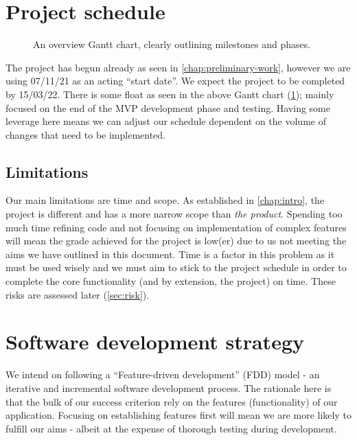 \vspace{-5mm}
\section{Project schedule}
\begin{figure}[H]
    \noindent{}
    \caption{An overview Gantt chart, clearly outlining milestones and phases.}
    \label{fig:gantt}
\end{figure}
\vspace{-5mm}
The project has begun already as seen in \cref{chap:preliminary-work}, however
we are using 07/11/21 as an acting ``start date''. We expect the project to be completed by
15/03/22. There is some float as seen in the above Gantt chart (\cref{fig:gantt});
mainly focused on the end of the MVP development phase and testing. Having some leverage
here means we can adjust our schedule dependent on the volume of changes that need to be implemented.
\vspace{-5mm}
\subsection{Limitations}
\vspace{-3mm}
Our main limitations are time and scope. As established in \cref{chap:intro},
the project is different and has a more narrow scope than \textit{the product}.
Spending too much time refining code and not focusing on implementation of complex features will mean
the grade achieved for the project is low(er) due to us not meeting the aims we have outlined in this document.
Time is a factor in this problem as it must be used wisely and we must aim to stick to the project schedule in order
to complete the core functionality (and by extension, the project) on time. These risks are assessed later (\cref{sec:risk}).
\pagebreak

\section{Software development strategy}
We intend on following a ``Feature-driven development'' (FDD) model - an iterative and incremental software development
process. The rationale here is that the bulk of our success criterion rely on the features (functionality) of our
application. Focusing on establishing features first will mean we are more likely to
fulfill our aims - albeit at the expense of thorough testing during development.
